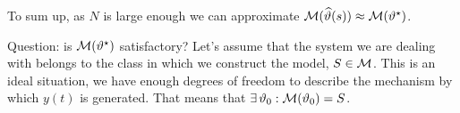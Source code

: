 To sum up, as $N$ is large enough we can approximate $\mathcal{M}(\widehat{\vartheta}(s))\approx\mathcal{M}(\vartheta ^{\star})$.

Question: is $\mathcal{M}(\vartheta^{\star})$ satisfactory? Let's assume that the system we are dealing with belongs to the class in which we construct the model, $S\in \mathcal{M}$. This is an ideal situation, we have enough degrees of freedom to describe the mechanism by which $y(t)$ is generated. That means that $\exists\,\vartheta_{0}: \mathcal{M}(\vartheta_{0}) = S$.